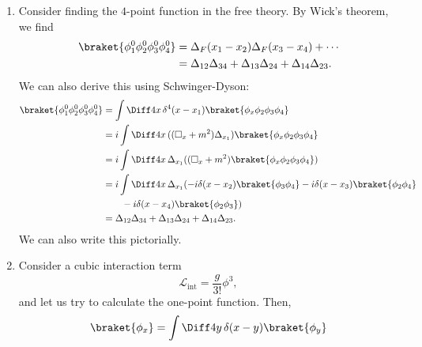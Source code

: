\documentclass[12pt]{article}
\begin{document}
\begin{exbox}
	\begin{enumerate}
		\item Consider finding the $4$-point function in the free theory. By Wick's theorem, we find
			\begin{align*}
				\braket{\phi_1^0 \phi_2^0 \phi_3^0 \phi_4^0} &= \Delta_F(x_1 - x_2) \Delta_F(x_3 - x_4) + \cdots \\
									     &= \Delta_{12} \Delta_{34} + \Delta_{13} \Delta_{24} + \Delta_{14} \Delta_{23}.
			\end{align*}
			We can also derive this using Schwinger-Dyson:
			\begin{align*}
				\braket{\phi_1^0 \phi_2^0 \phi_3^0 \phi_4^0} &= \int \Diff 4 x \, \delta^{4}(x - x_1) \braket{\phi_x \phi_2 \phi_3 \phi_4 } \\
									     &= i \int \Diff 4 x \, ((\square_x + m^2) \Delta_{x_1}) \braket{\phi_x \phi_2 \phi_3 \phi_4} \\
									     &= i \int \Diff4 x \, \Delta_{x_1}((\square_x + m^2) \braket{\phi_x \phi_2 \phi_3 \phi_4}) \\
									     &= i \int \Diff 4 x \, \Delta_{x_1}(-i \delta(x - x_2) \braket{\phi_3\phi_4} - i \delta(x - x_3) \braket{\phi_2\phi_4} \\
									     & \qquad - i \delta(x - x_4) \braket{\phi_2 \phi_3}) \\
									     &= \Delta_{12} \Delta_{34} + \Delta_{13} \Delta_{24} + \Delta_{14} \Delta_{23}.
			\end{align*}
			We can also write this pictorially.
		\item Consider a cubic interaction term
			\[
			\mathcal{L}_{\mathrm{int}} = \frac{g}{3!} \phi^3,
			\]
			and let us try to calculate the one-point function. Then,
			\begin{align*}
				\braket{\phi_x} &= \int \Diff 4 y \, \delta(x - y) \braket{\phi_y} \\

\end{align*}
\end{enumerate}
\end{exbox}
\end{document}
